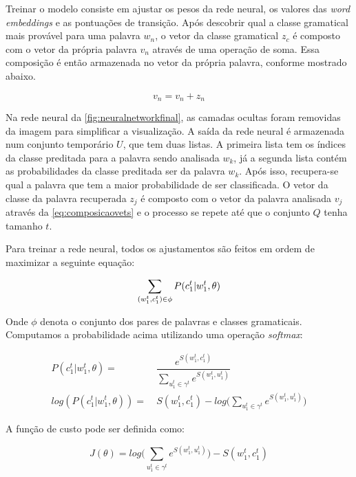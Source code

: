 Treinar o modelo consiste em ajustar os pesos da rede neural, os valores das \textit{word embeddings} e as pontuações de transição. Após descobrir qual a classe gramatical mais provável para uma palavra $w_n$, o vetor da classe gramatical $z_c$ é composto com o vetor da própria palavra $v_n$ através de uma operação de soma. Essa composição é então armazenada no vetor da própria palavra, conforme mostrado abaixo. 

\begin{equation} \label{eq:composicaovets}
v_n = v_n + z_n
\end{equation}

Na rede neural da \autoref{fig:neuralnetworkfinal}, as camadas ocultas foram removidas da imagem para simplificar a visualização. A saída da rede neural é armazenada num conjunto temporário $U$, que tem duas listas. A primeira lista tem os índices da classe preditada para a palavra sendo analisada $w_k$, já a segunda lista contém as probabilidades da classe preditada ser da palavra $w_k$. Após isso, recupera-se qual a palavra que tem a maior probabilidade de ser classificada. O vetor da classe da palavra recuperada $z_j$ é composto com o vetor da palavra analisada $v_j$ através da \autoref{eq:composicaovets} e o processo se repete até que o conjunto $Q$ tenha tamanho $t$.

Para treinar a rede neural, todos os ajustamentos são feitos em ordem de maximizar a seguinte equação:

\begin{equation}
\sum\limits_{(w_1^t,c_1^t) \in \phi} P(c_1^t|w_1^t,\theta) \nonumber \\
\end{equation}

Onde $\phi$ denota o conjunto dos pares de palavras e classes gramaticais. Computamos a probabilidade acima utilizando uma operação \textit{softmax}:

\begin{align}
P(c_1^t|w_1^t,\theta) = &\ \dfrac{e^{S(w_1^t, c_1^t)}}{\sum\limits_{u_1^t \in \gamma^t} e^{S(w_1^t, u_1^t)}} \nonumber \nonumber \\
log(P(c_1^t|w_1^t,\theta)) = &\ S(w_1^t, c_1^t) - log\Bigg(\sum\limits_{u_1^t \in \gamma^t} e^{S(w_1^t, u_1^t)} \Bigg) \nonumber
\end{align}

A função de custo pode ser definida como:

\begin{equation} \label{eq:costfunctionfinalnn}
J(\theta) = log\Bigg(\sum\limits_{u_1^t \in \gamma^t} e^{S(w_1^t, u_1^t)} \Bigg) - S(w_1^t, c_1^t)
\end{equation}

